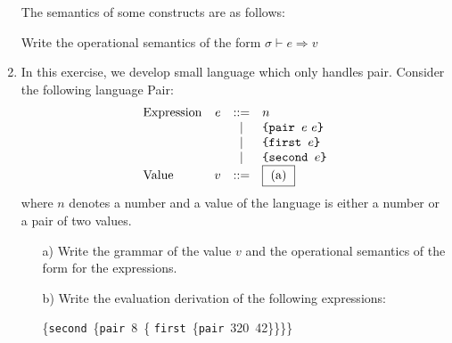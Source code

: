 \begin{enumerate}
The semantics of some constructs are as follows:

Write the operational semantics of the form
$$

\item In this exercise, we develop small language which only handles pair. Consider the following language Pair:
\[
\begin{array}{lrcl}
\text{Expression}& e & ::= & n \\
&&\mid& \verb!{pair ! e\ e\verb+}+\\
&&\mid& \verb!{first ! e\verb+}+\\
&&\mid& \verb!{second ! e\verb+}+\\
\text{Value} & v & ::= & \fbox{ (a) }
\end{array}
\]
where $n$ denotes a number and a value of the language is either a number or a pair of two values.
\begin{itemize}
  \item[a)] Write the grammar of the value $v$ and
 the operational semantics of the form  for the expressions.
  \item[b)] Write the evaluation derivation of the following expressions:

\hspace*{-5em}
 \derive
{\hspace*{\textwidth}}
{\vdash
 \{\texttt{second}\ \{\texttt{pair}\ 8\ \{
 \texttt{first}\ \{\texttt{pair}\ 320\ 42\}\}\}\}
 \Rightarrow~~~~~~~~}
\end{itemize}


\end{enumerate}
